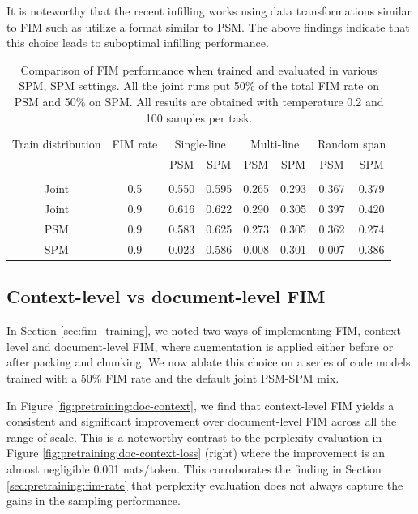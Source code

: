 \documentclass[postscript]{article}
\newcommand\Tstrut{\rule{0pt}{2.6ex}}
\begin{document}
It is noteworthy that the recent infilling works using data transformations similar to FIM such as \citep{donahue, cm3, incoder} utilize a format similar to PSM. The above findings indicate that this choice leads to suboptimal infilling performance.


\begin{table}[ht!]
\centering

\begin{tabular}{cccccccc}
\hline\Tstrut
Train distribution & FIM rate &  \multicolumn{2}{c}{Single-line} &\multicolumn{2}{c}{Multi-line } & \multicolumn{2}{c}{Random span } \\ 
 & & PSM & SPM & PSM & SPM & PSM & SPM \\[0.1cm]
\hline \\ [-0.2cm]
Joint & 0.5 & 0.550 & 0.595 & 0.265 & 0.293 & 0.367 & 0.379 \\
Joint & 0.9 & 0.616 & 0.622 & 0.290 & 0.305 & 0.397 & 0.420 \\
PSM & 0.9 & 0.583 & 0.625 & 0.273 & 0.305 & 0.362 & 0.274 \\
SPM & 0.9 & 0.023 & 0.586 & 0.008 & 0.301 &  0.007 & 0.386 \\
\hline
\end{tabular}
\caption{Comparison of FIM performance when trained and evaluated in various SPM, SPM settings.  All the joint runs put 50\% of the total FIM rate on PSM and 50\% on SPM. All results are obtained with temperature 0.2 and 100 samples per task.  }
\label{tab:pretraining:psm-spm}
\end{table}




\subsection{Context-level vs document-level FIM}
\label{sec:pretraining:context}

In Section \ref{sec:fim_training}, we noted two ways of implementing FIM, context-level and document-level FIM, where augmentation is applied either before or after packing and chunking. We now ablate this choice on a series of code models trained with a 50\% FIM rate and the default joint PSM-SPM mix.

In Figure \ref{fig:pretraining:doc-context}, we find that context-level FIM yields a consistent and significant improvement over document-level FIM across all the range of scale. This is a noteworthy contrast to the perplexity evaluation in Figure \ref{fig:pretraining:doc-context-loss} (right) where the improvement is an almost negligible 0.001 nats/token. This corroborates the finding in Section \ref{sec:pretraining:fim-rate} that perplexity evaluation does not always capture the gains in the sampling performance.
\end{document}
